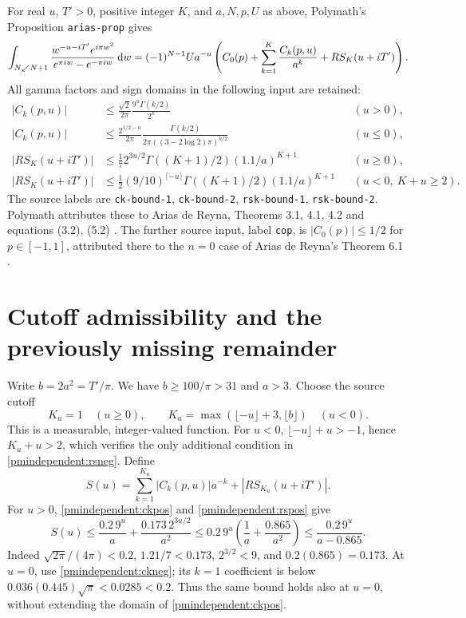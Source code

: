 For real $u$, $T'>0$, positive integer $K$, and $a,N,p,U$ as above,
Polymath's Proposition \texttt{arias-prop} gives
\begin{equation}\label{pmindependent:RSexp}
 \int_{N\swarrow N+1}\frac{w^{-u-iT'}e^{i\pi w^2}}
 {e^{\pi iw}-e^{-\pi iw}}\,\mathrm d w
 =(-1)^{N-1}Ua^{-u}
 \left(C_0(p)+\sum_{k=1}^K\frac{C_k(p,u)}{a^k}+RS_K(u+iT')\right).
\end{equation}
All gamma factors and sign domains in the following input are retained:
\begin{align}
 |C_k(p,u)|&\le\frac{\sqrt2}{2\pi}
                      \frac{9^u\Gamma(k/2)}{2^k} &&(u>0),\label{pmindependent:ckpos}\\
 |C_k(p,u)|&\le\frac{2^{1/2-u}}{2\pi}
       \frac{\Gamma(k/2)}{2\pi((3-2\log2)\pi)^{k/2}} &&(u\le0),\label{pmindependent:ckneg}\\
 |RS_K(u+iT')|&\le\frac17 2^{3u/2}
                         \Gamma((K+1)/2)(1.1/a)^{K+1} &&(u\ge0),\label{pmindependent:rspos}\\
 |RS_K(u+iT')|&\le\frac12(9/10)^{\lceil-u\rceil}
                   \Gamma((K+1)/2)(1.1/a)^{K+1}
                          &&(u<0,\ K+u\ge2).\label{pmindependent:rsneg}
\end{align}
The source labels are \texttt{ck-bound-1}, \texttt{ck-bound-2},
\texttt{rsk-bound-1}, \texttt{rsk-bound-2}. Polymath attributes these
to Arias de Reyna, Theorems 3.1, 4.1, 4.2 and equations (3.2), (5.2)
\cite{pmindependent:arias}. The further source input, label \texttt{cop}, is
$|C_0(p)|\le1/2$ for $p\in[-1,1]$, attributed there to the $n=0$
case of Arias de Reyna's Theorem 6.1 \cite{pmindependent:polymath,pmindependent:arias}.

\section{Cutoff admissibility and the previously missing remainder}

Write $b=2a^2=T'/\pi$. We have $b\ge100/\pi>31$ and $a>3$.
Choose the source cutoff
\[
 K_u=1\quad(u\ge0),\qquad
 K_u=\max(\lfloor-u\rfloor+3,\lfloor b\rfloor)\quad(u<0).
\]
This is a measurable, integer-valued function. For $u<0$,
$\lfloor-u\rfloor+u>-1$, hence $K_u+u>2$, which verifies
the only additional condition in \eqref{pmindependent:rsneg}. Define
\[
 S(u)=\sum_{k=1}^{K_u}|C_k(p,u)|a^{-k}+|RS_{K_u}(u+iT')|.
\]
For $u>0$, \eqref{pmindependent:ckpos} and \eqref{pmindependent:rspos} give
\[
 S(u)\le\frac{0.2\,9^u}{a}+\frac{0.173\,2^{3u/2}}{a^2}
 \le0.2\,9^u\left(\frac1a+\frac{0.865}{a^2}\right)
 \le\frac{0.2\,9^u}{a-0.865}.
\]
Indeed $\sqrt{2\pi}/(4\pi)<0.2$, $1.21/7<0.173$,
$2^{3/2}<9$, and $0.2(0.865)=0.173$.
At $u=0$, use \eqref{pmindependent:ckneg}; its $k=1$ coefficient is below
$0.036(0.445)\sqrt\pi<0.0285<0.2$. Thus the same bound holds
also at $u=0$, without extending the domain of \eqref{pmindependent:ckpos}.

